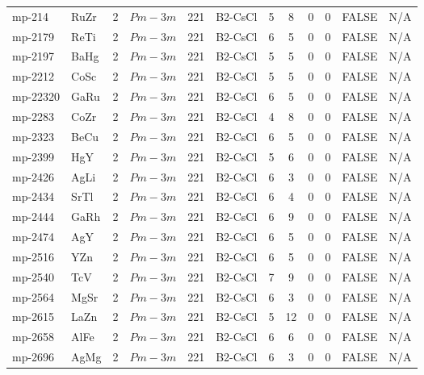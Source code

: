 {\begin{longtable}{llcccccccccc}
    mp-214 & RuZr  & 2     & $Pm-3m$ & 221   & B2-CsCl & 5     & 8     & 0     & 0     & FALSE & N/A \\
    mp-2179 & ReTi  & 2     & $Pm-3m$ & 221   & B2-CsCl & 6     & 5     & 0     & 0     & FALSE & N/A \\
    mp-2197 & BaHg  & 2     & $Pm-3m$ & 221   & B2-CsCl & 5     & 5     & 0     & 0     & FALSE & N/A \\
    mp-2212 & CoSc  & 2     & $Pm-3m$ & 221   & B2-CsCl & 5     & 5     & 0     & 0     & FALSE & N/A \\
    mp-22320 & GaRu  & 2     & $Pm-3m$ & 221   & B2-CsCl & 6     & 5     & 0     & 0     & FALSE & N/A \\
    mp-2283 & CoZr  & 2     & $Pm-3m$ & 221   & B2-CsCl & 4     & 8     & 0     & 0     & FALSE & N/A \\
    mp-2323 & BeCu  & 2     & $Pm-3m$ & 221   & B2-CsCl & 6     & 5     & 0     & 0     & FALSE & N/A \\
    mp-2399 & HgY   & 2     & $Pm-3m$ & 221   & B2-CsCl & 5     & 6     & 0     & 0     & FALSE & N/A \\
    mp-2426 & AgLi  & 2     & $Pm-3m$ & 221   & B2-CsCl & 6     & 3     & 0     & 0     & FALSE & N/A \\
    mp-2434 & SrTl  & 2     & $Pm-3m$ & 221   & B2-CsCl & 6     & 4     & 0     & 0     & FALSE & N/A \\
    mp-2444 & GaRh  & 2     & $Pm-3m$ & 221   & B2-CsCl & 6     & 9     & 0     & 0     & FALSE & N/A \\
    mp-2474 & AgY   & 2     & $Pm-3m$ & 221   & B2-CsCl & 6     & 5     & 0     & 0     & FALSE & N/A \\
    mp-2516 & YZn   & 2     & $Pm-3m$ & 221   & B2-CsCl & 6     & 5     & 0     & 0     & FALSE & N/A \\
    mp-2540 & TcV   & 2     & $Pm-3m$ & 221   & B2-CsCl & 7     & 9     & 0     & 0     & FALSE & N/A \\
    mp-2564 & MgSr  & 2     & $Pm-3m$ & 221   & B2-CsCl & 6     & 3     & 0     & 0     & FALSE & N/A \\
    mp-2615 & LaZn  & 2     & $Pm-3m$ & 221   & B2-CsCl & 5     & 12    & 0     & 0     & FALSE & N/A \\
    mp-2658 & AlFe  & 2     & $Pm-3m$ & 221   & B2-CsCl & 6     & 6     & 0     & 0     & FALSE & N/A \\
    mp-2696 & AgMg  & 2     & $Pm-3m$ & 221   & B2-CsCl & 6     & 3     & 0     & 0     & FALSE & N/A \\

\end{longtable}}
